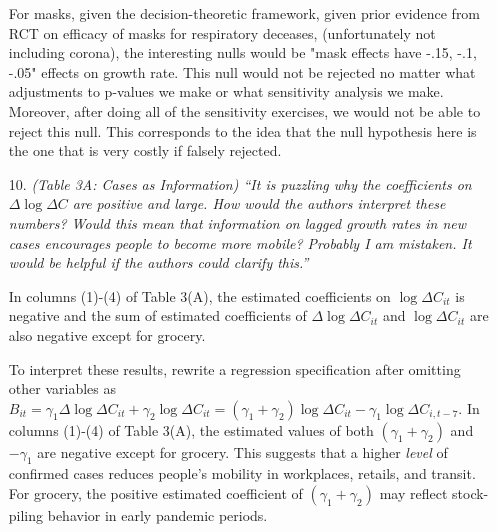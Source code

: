 \documentclass[11pt]{article}
\begin{document}
\begin{itemize}


 For masks, given the decision-theoretic framework, given prior evidence from RCT on efficacy of masks for respiratory deceases, (unfortunately not including corona), the interesting nulls would be "mask effects  have -.15, -.1, -.05" effects on growth rate. This null would not be  rejected no matter what adjustments to p-values we make or what sensitivity analysis we make.  Moreover, after doing all of the sensitivity exercises, we would not be able to reject this null.   This corresponds to the idea that the null hypothesis
 here is the one that is very costly if falsely rejected.



  
\item[10.]  \textit{(Table 3A: Cases as Information) ``It is puzzling why the coefficients on  $\Delta\log\Delta C$ are positive
and large. How would the authors interpret these numbers? Would this mean that information
on lagged growth rates in new cases encourages people to become more mobile?
Probably I am mistaken. It would be helpful if the authors could clarify this.''}

In columns (1)-(4) of Table 3(A), the estimated coefficients on $\log\Delta C_{it}$ is negative and the sum of estimated coefficients of $\Delta \log\Delta C_{it} $ and $\log\Delta C_{it}$ are also negative except for grocery.

To interpret these results, rewrite a regression specification after omitting other variables as 
$B_{it} =  \gamma_1 \Delta \log\Delta C_{it} + \gamma_2   \log\Delta C_{it} =  (\gamma_1 +\gamma_2) \log\Delta C_{it} - \gamma_1   \log\Delta C_{i,t-7}$.
In columns (1)-(4) of Table 3(A),  the estimated values of both $(\gamma_1 +\gamma_2)$ and $-\gamma_1$ are negative except for grocery. This suggests that  a higher \textit{level} of confirmed cases reduces people's mobility in workplaces, retails, and transit. For grocery, the positive estimated coefficient of $(\gamma_1 +\gamma_2)$ may reflect stock-piling behavior in early pandemic periods.
  

\end{itemize}
\end{document}
